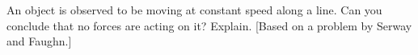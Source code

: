 An object is observed to be moving at constant speed
        along a line. Can you conclude that no forces are acting on
        it? Explain. [Based on a problem by Serway and Faughn.]        
